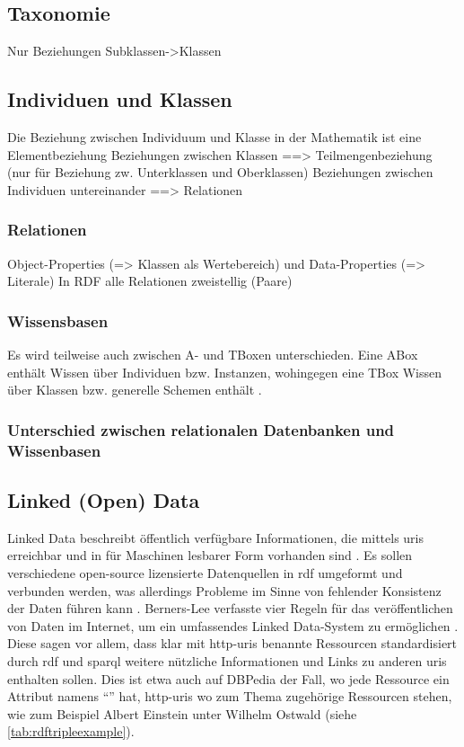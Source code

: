 \subsection{Taxonomie}

Nur Beziehungen Subklassen->Klassen

\subsection{Individuen und Klassen}
Die Beziehung zwischen Individuum und Klasse in der Mathematik ist eine Elementbeziehung
Beziehungen zwischen Klassen ==> Teilmengenbeziehung (nur für Beziehung zw. Unterklassen und Oberklassen)
Beziehungen zwischen Individuen untereinander ==> Relationen
\subsubsection{Relationen}
Object-Properties (=> Klassen als Wertebereich) und Data-Properties (=> Literale)
In RDF alle Relationen zweistellig (Paare)
\subsubsection{Wissensbasen}
Es wird teilweise auch zwischen A- und TBoxen unterschieden.
Eine ABox enthält Wissen über Individuen bzw. Instanzen, wohingegen eine TBox Wissen über Klassen bzw. generelle Schemen enthält \citep[S.~167]{semanticwebgrundlagen}.
\subsubsection{Unterschied zwischen relationalen Datenbanken und Wissenbasen}



\subsection{Linked (Open) Data}

Linked Data beschreibt öffentlich verfügbare Informationen, die mittels \acp{uri} erreichbar und in für Maschinen lesbarer Form vorhanden sind \citep{linkeddata}.
Es sollen verschiedene open-source lizensierte Datenquellen in \ac{rdf} umgeformt und verbunden werden, was allerdings Probleme im Sinne von fehlender Konsistenz der Daten führen kann \citep{semanticwebreview}.
Berners-Lee verfasste vier Regeln für das veröffentlichen von Daten im Internet, um ein umfassendes Linked Data-System zu ermöglichen \citep{linkeddatadesignissues}.
Diese sagen vor allem, dass klar mit \ac{http}-\acp{uri} benannte Ressourcen standardisiert durch \ac{rdf} und \ac{sparql} weitere nützliche Informationen und Links zu anderen \acp{uri} enthalten sollen.
Dies ist etwa auch auf DBPedia der Fall, wo jede Ressource ein Attribut namens \enquote{} hat, \ac{http}-\acp{uri} wo zum Thema zugehörige Ressourcen stehen,
wie zum Beispiel Albert Einstein unter Wilhelm Ostwald (siehe \cref{tab:rdftripleexample}).

